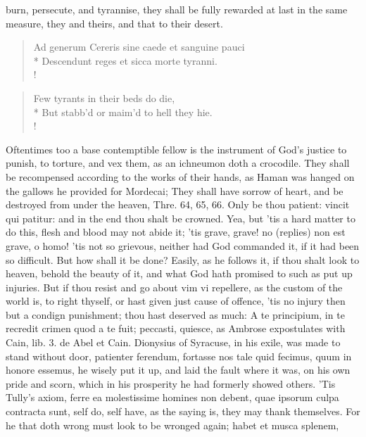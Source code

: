 {burn, persecute, and tyrannise, they shall be fully rewarded at last in
the same measure, they and theirs, and that to their desert.
%
%
\begin{latin}%
\begin{verse}%
Ad generum Cereris sine caede et sanguine pauci\\*
Descendunt reges et sicca morte tyranni.\\!
\end{verse}%
\end{latin}%
\translationrule%
\begin{verse}%
Few tyrants in their beds do die,\\*
But stabb'd or maim'd to hell they hie.\\!
\end{verse}%
%
Oftentimes too a base contemptible fellow is the instrument of God's
justice to punish, to torture, and vex them, as an ichneumon doth a
crocodile. They shall be recompensed according to the works of their
hands, as Haman was hanged on the gallows he provided for Mordecai;
They shall have sorrow of heart, and be destroyed from under the
heaven, Thre.  64, 65, 66. Only be thou patient: vincit qui
patitur: and in the end thou shalt be crowned. Yea, but 'tis a hard
matter to do this, flesh and blood may not abide it; 'tis grave, grave!
no (\Chrysostom replies) non est grave, o homo! 'tis not so grievous,
neither had God commanded it, if it had been so difficult. But
how shall it be done? Easily, as he follows it, if thou shalt look to
heaven, behold the beauty of it, and what God hath promised to such as
put up injuries. But if thou resist and go about vim vi repellere, as
the custom of the world is, to right thyself, or hast given just cause
of offence, 'tis no injury then but a condign punishment; thou hast
deserved as much: A te principium, in te recredit crimen quod a te
fuit; peccasti, quiesce, as Ambrose expostulates with Cain, lib. 3. de
Abel et Cain. Dionysius of Syracuse, in his exile, was made to
stand without door, patienter ferendum, fortasse nos tale quid fecimus,
quum in honore essemus, he wisely put it up, and laid the fault where
it was, on his own pride and scorn, which in his prosperity he had
formerly showed others. 'Tis  Tully's axiom, ferre ea
molestissime homines non debent, quae ipsorum culpa contracta sunt,
self do, self have, as the saying is, they may thank themselves. For he
that doth wrong must look to be wronged again; habet et musca splenem,
}
